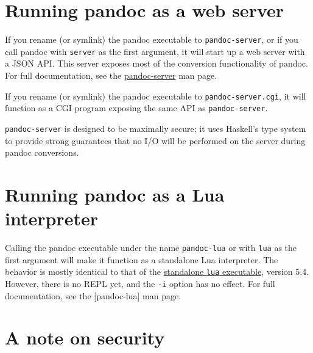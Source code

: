 \hypertarget{running-pandoc-as-a-web-server}{%
\section{Running pandoc as a web
server}\label{running-pandoc-as-a-web-server}}

If you rename (or symlink) the pandoc executable to
\texttt{pandoc-server}, or if you call pandoc with \texttt{server} as
the first argument, it will start up a web server with a JSON API. This
server exposes most of the conversion functionality of pandoc. For full
documentation, see the
\href{https://github.com/jgm/pandoc/blob/master/doc/pandoc-lua.md}{pandoc-server}
man page.

If you rename (or symlink) the pandoc executable to
\texttt{pandoc-server.cgi}, it will function as a CGI program exposing
the same API as \texttt{pandoc-server}.

\texttt{pandoc-server} is designed to be maximally secure; it uses
Haskell's type system to provide strong guarantees that no I/O will be
performed on the server during pandoc conversions.

\hypertarget{running-pandoc-as-a-lua-interpreter}{%
\section{Running pandoc as a Lua
interpreter}\label{running-pandoc-as-a-lua-interpreter}}

Calling the pandoc executable under the name \texttt{pandoc-lua} or with
\texttt{lua} as the first argument will make it function as a standalone
Lua interpreter. The behavior is mostly identical to that of the
\href{https://www.lua.org/manual/5.4/manual.html\#7}{standalone
\texttt{lua} executable}, version 5.4. However, there is no REPL yet,
and the \texttt{-i} option has no effect. For full documentation, see
the {[}pandoc-lua{]} man page.

\hypertarget{a-note-on-security}{%
\section{A note on security}\label{a-note-on-security}}

